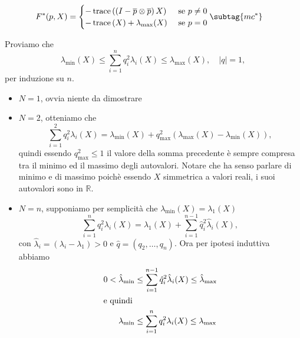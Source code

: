 \begin{enumi}
\begin{subequations}
\begin{align}
  \label{eq:cp2-13-2}%
  F^*(p,X) &=%
  \begin{cases}
   -\trace\left(\left(I-\overline{p}\otimes\overline{p}\right)X\right) &\text{ se } p\ne 0 \\
   -\trace\left(X\right)+\lambda_{\text{max}}(X) & \text{ se }p = 0
  \end{cases} \subtag{mc^*}
\end{align}
\end{subequations}
\begin{osservazione}
  \label{oss:cp2-02}
  Proviamo che 
\[
\lambda_{\text{min}}(X)\leq\sum_{i=1}^nq_i^2\lambda_i(X)\leq\lambda_{\text{max}}(X),\quad |q| = 1,
\]
per induzione su $n$.
\begin{itemize}
  \item $N=1$, ovvia niente da dimostrare
  \item $N=2$, otteniamo che
\[
\sum_{i=1}^2q_i^2\lambda_i(X)=\lambda_{\text{min}}(X) + q_{\text{max}}^2(\lambda_{\text{max}}(X)-\lambda_{\text{min}}(X)),
\]
quindi essendo $q_{\text{max}}^2\leq 1$ il valore della somma precedente è sempre compresa tra il minimo ed il massimo degli autovalori. Notare che ha senso parlare di minimo e di massimo poichè essendo $X$ simmetrica a valori reali, i suoi autovalori sono in $\mathbb{R}$.
  \item $N=n$, supponiamo per semplicità che $\lambda_{\text{min}}(X)=\lambda_1(X)$
\[
\sum_{i=1}^nq_i^2\lambda_i(X)=\lambda_1(X)+\sum_{i=1}^{n-1}\hat{q}_i^2\hat{\lambda}_i(X),
\]
con $\hat{\lambda}_i=(\lambda_i-\lambda_1)>0$ e $\hat{q}=(q_2,\dots,q_n)$. Ora per ipotesi induttiva abbiamo
\begin{align}
0<\hat{\lambda}_{\text{min}}&\leq\sum_{i=1}^{n-1}\hat{q}_i^2\hat{\lambda}_i(X)\leq\hat{\lambda}_{\text{max}} \notag\\
\intertext{e quindi}
\lambda_{\text{min}}&\leq\sum_{i=1}^nq_i^2\lambda_i(X)\leq\lambda_{\text{max}}\notag
\end{align}


\end{itemize}
\end{osservazione}
\end{enumi}
